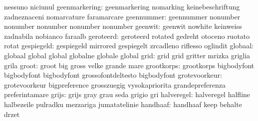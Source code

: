                            nessuno                   niciunul
            geenmarkering: geenmarkering             nomarking
                           keinebeschriftung         zadneznaceni
                           nomarcature               faramarcare
               geennummer: geennummer                nonumber
                           nonumber                  nonumber
                           nonumber                  nonumber %
                  geenwit: geenwit                   nowhite
                           keinweiss                 zadnabila
                           nobianco                  faraalb
                geroteerd: geroteerd                 rotated
                           gedreht                   otoceno
                           ruotato                   rotat
               gespiegeld: gespiegeld                mirrored
                           gespiegelt                zrcadleno
                           riflesso                  oglindit
                  globaal: globaal                   global
                           global                    globalne
                           globale                   global
                     grid: grid                      grid
                           gritter                   mrizka
                           griglia                   grila
                    groot: groot                     big
                           gross                     velke
                           grande                    mare
               grootkorps: grootkorps                bigbodyfont
                           bigbodyfont               bigbodyfont
                           grossofontdeltesto        bigbodyfont %
            grotevoorkeur: grotevoorkeur             bigpreference
                           grosszuegig               vysokapriorita
                           grandepreferenza          preferintamare
                    grijs: grijs                     gray
                           grau                      seda
                           grigio                    gri
               halveregel: halveregel                halfline
                           halbezeile                pulradku
                           mezzariga                 jumatatelinie
                 handhaaf: handhaaf                  keep
                           behalte                   drzet
